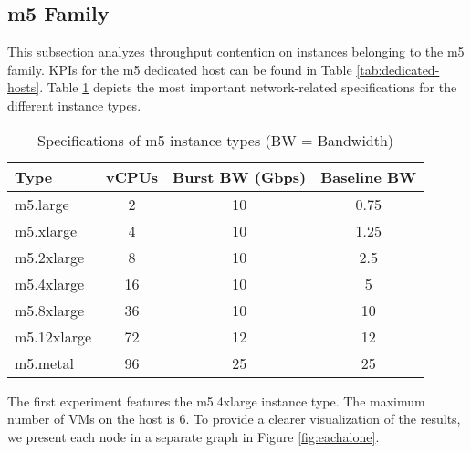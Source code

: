 \subsection{m5 Family}
This subsection analyzes throughput contention on instances belonging to the m5 family. KPIs 
for the m5 dedicated host can be found in Table \ref{tab:dedicated-hosts}.
Table \ref{tab:m5_spec} depicts the most important network-related specifications for the different 
instance types.
\begin{table}[H]
\centering
\begin{tabular}{lccc}
\toprule
\textbf{Type} & \textbf{vCPUs} & \textbf{Burst BW (Gbps) \cite{cloudspecs}} & \textbf{Baseline BW \cite{cloudspecs}} \\
\midrule
m5.large     & 2  & 10 & 0.75 \\
m5.xlarge    & 4  & 10 & 1.25 \\
m5.2xlarge   & 8  & 10 & 2.5  \\
m5.4xlarge   & 16 & 10 & 5    \\
m5.8xlarge   & 36 & 10 & 10   \\
m5.12xlarge  & 72 & 12 & 12   \\
m5.metal     & 96 & 25 & 25   \\
\bottomrule
\end{tabular}
\caption{Specifications of m5 instance types (BW = Bandwidth)}
\label{tab:m5_spec}
\end{table}
\noindent
The first experiment features the m5.4xlarge instance type. 
The maximum number of VMs on the host is 6.
To provide a clearer visualization of the results, we present each node in a separate graph in 
Figure \ref{fig:eachalone}.
